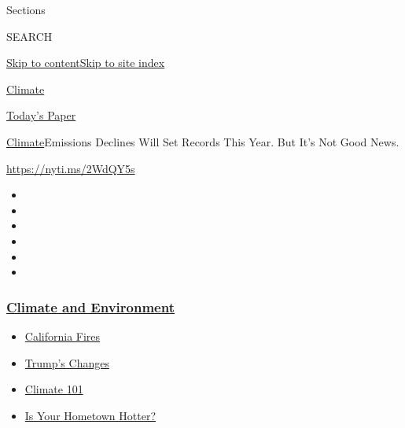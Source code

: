 Sections

SEARCH

\protect\hyperlink{site-content}{Skip to
content}\protect\hyperlink{site-index}{Skip to site index}

\href{https://www.nytimes3xbfgragh.onion/section/climate}{Climate}

\href{https://myaccount.nytimes3xbfgragh.onion/auth/login?response_type=cookie\&client_id=vi}{}

\href{https://www.nytimes3xbfgragh.onion/section/todayspaper}{Today's
Paper}

\href{/section/climate}{Climate}\textbar{}Emissions Declines Will Set
Records This Year. But It's Not Good News.

\url{https://nyti.ms/2WdQY5s}

\begin{itemize}
\item
\item
\item
\item
\item
\item
\end{itemize}

\hypertarget{climate-and-environment}{%
\subsubsection{\texorpdfstring{\href{https://www.nytimes3xbfgragh.onion/section/climate?name=styln-climate\&region=TOP_BANNER\&block=storyline_menu_recirc\&action=click\&pgtype=Article\&impression_id=600ce730-f1e3-11ea-8772-c75414e6f942\&variant=undefined}{Climate
and
Environment}}{Climate and Environment}}\label{climate-and-environment}}

\begin{itemize}
\tightlist
\item
  \href{https://www.nytimes3xbfgragh.onion/article/why-does-california-have-wildfires.html?name=styln-climate\&region=TOP_BANNER\&block=storyline_menu_recirc\&action=click\&pgtype=Article\&impression_id=600d0e40-f1e3-11ea-8772-c75414e6f942\&variant=undefined}{California
  Fires}
\item
  \href{https://www.nytimes3xbfgragh.onion/interactive/2020/climate/trump-environment-rollbacks.html?name=styln-climate\&region=TOP_BANNER\&block=storyline_menu_recirc\&action=click\&pgtype=Article\&impression_id=600d0e41-f1e3-11ea-8772-c75414e6f942\&variant=undefined}{Trump's
  Changes}
\item
  \href{https://www.nytimes3xbfgragh.onion/interactive/2020/04/19/climate/climate-crash-course-1.html?name=styln-climate\&region=TOP_BANNER\&block=storyline_menu_recirc\&action=click\&pgtype=Article\&impression_id=600d0e42-f1e3-11ea-8772-c75414e6f942\&variant=undefined}{Climate
  101}
\item
  \href{https://www.nytimes3xbfgragh.onion/interactive/2018/08/30/climate/how-much-hotter-is-your-hometown.html?name=styln-climate\&region=TOP_BANNER\&block=storyline_menu_recirc\&action=click\&pgtype=Article\&impression_id=600d0e43-f1e3-11ea-8772-c75414e6f942\&variant=undefined}{Is
  Your Hometown Hotter?}
\end{itemize}


